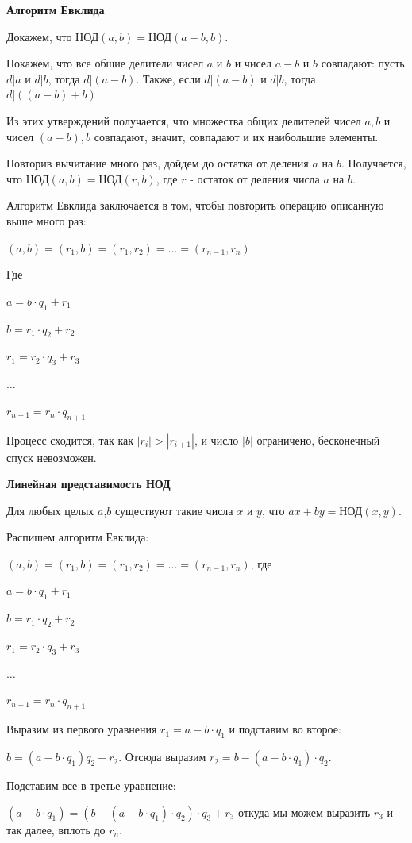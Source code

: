 \centerline{\bf \Huge Алгоритм Евклида}

Докажем, что $\text{НОД}(a,b)=\text{НОД}(a-b,b)$.

Покажем, что все общие делители чисел $a$ и $b$ и чисел $a-b$ и $b$ совпадают: пусть $d|a$ и $d|b$, тогда $d|(a-b)$. Также, если $d|(a-b)$ и $d|b$, тогда $d|((a-b)+b)$.

Из этих утверждений получается, что множества общих делителей чисел $a,b$ и чисел $(a-b),b$ совпадают, значит, совпадают и их наибольшие элементы. 

Повторив вычитание много раз, дойдем до остатка от деления $a$ на $b$. Получается, что  $\text{НОД}(a,b)=\text{НОД}(r,b)$, где $r$ - остаток от деления числа $a$ на $b$.

Алгоритм Евклида заключается в том, чтобы повторить операцию описанную выше много раз: 

$(a,b)=(r_1,b)=(r_1,r_2)=\ldots=(r_{n-1},r_n)$.

Где

$a=b\cdot q_1+r_1$

$b=r_1 \cdot q_2 + r_2$

$r_1=r_2 \cdot q_3 + r_3$

$\ldots$

$r_{n-1}=r_n \cdot q_{n+1} $

Процесс сходится, так как $|r_i| > |r_{i+1}|$, и число $|b|$ ограничено, бесконечный спуск невозможен.

\centerline{\bf \Huge Линейная представимость НОД}

Для любых целых $a$,$b$ существуют такие числа $x$ и $y$, что $ax+by=\text{НОД}(x,y)$.

Распишем алгоритм Евклида:

$(a,b)=(r_1,b)=(r_1,r_2)=\ldots=(r_{n-1},r_n)$, где 

$a=b\cdot q_1+r_1$

$b=r_1 \cdot q_2 + r_2$

$r_1=r_2 \cdot q_3 + r_3$

$\ldots$

$r_{n-1}=r_n \cdot q_{n+1} $


Выразим из первого уравнения $r_1=a-b\cdot q_1$ и подставим во второе:

$b=(a-b \cdot q_1) q_2 + r_2$. Отсюда выразим $r_2=b-(a-b\cdot q_1) \cdot q_2$.

Подставим все в третье уравнение:

$(a-b\cdot q_1)=(b-(a-b\cdot q_1) \cdot q_2) \cdot q_3 + r_3$ откуда мы можем выразить $r_3$ и так далее, вплоть до $r_n$. 


